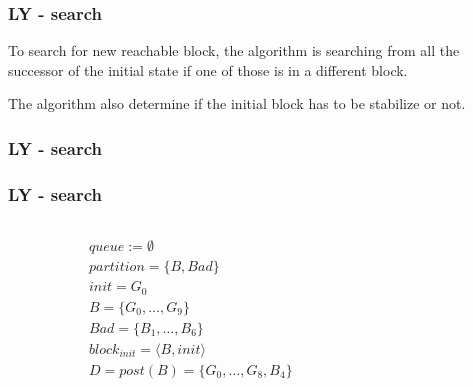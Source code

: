 \documentclass[11pt,handout]{beamer}
\begin{document}
\begin{frame}
  \frametitle{LY - search}
  To search for new reachable block, the algorithm is searching from all the
  successor of the initial state if one of those is in a different block.

  \pause
  \vspace*{1cm}

  The algorithm also determine if the initial block has to be stabilize or not.
\end{frame}

\begin{frame}[fragile]
  \frametitle{LY - search}
  \begin{algorithmic}
    \EndIf
     
    \EndIf
    \EndFor
     
    \EndIf
  \end{algorithmic}
\end{frame}

\begin{frame}[fragile]
  \frametitle{LY - search}
  \begin{columns}
    \begin{column}{0.5\textwidth}
      \begin{align*}
        & queue := \emptyset \\
        & partition = \{B, Bad\} \\
        & init = G_0 \\
        & B = \{G_0,\dots,G_9\}\\
        & Bad = \{B_1,\dots,B_6\} \\
        & block_{init} = \langle B,init \rangle \\
        & D = post(B) = \{ G_0,\dots,G_8,B_4\}
      \end{align*}
    \end{column}
    \begin{column}{0.5\textwidth}%
      
    \end{column}
  \end{columns}
\end{frame}
  
\end{document}
